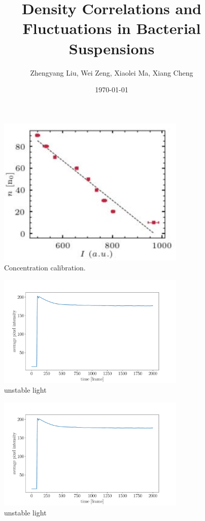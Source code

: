\documentclass[11px]{article}
\title{Density Correlations and Fluctuations in Bacterial Suspensions}
\author{Zhengyang Liu, Wei Zeng, Xiaolei Ma, Xiang Cheng}
\date{\today}
\begin{document}
\maketitle

\begin{figure}[h]
\begin{center}
\includegraphics[width=0.8\textwidth]{fig-s1_conc-calibration.jpg}
\caption[]{Concentration calibration.}
\end{center}
\label{fig:s1}
\end{figure}


\begin{figure}[h]
\begin{center}
\includegraphics[width=0.8\textwidth]{fig-s2_unstable-light.pdf}
\caption[]{unstable light}
\end{center}
\label{fig:s2}
\end{figure}

\begin{figure}[h]
\begin{center}
\includegraphics[width=0.8\textwidth]{fig-s2_unstable-light.pdf}
\caption[]{unstable light}
\end{center}
\label{fig:s2}
\end{figure}
\end{document}
